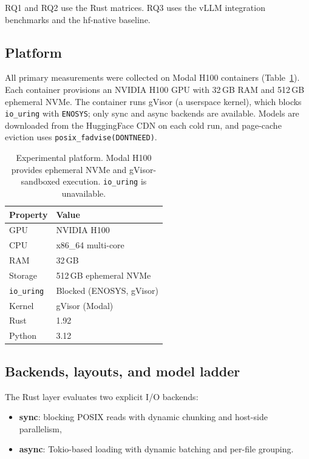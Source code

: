 RQ1 and RQ2 use the Rust matrices. RQ3 uses the vLLM integration benchmarks and the hf-native baseline.

\subsection{Platform}

All primary measurements were collected on Modal H100 containers (Table~\ref{tab:platform}). Each container provisions an NVIDIA H100 GPU with 32\,GB RAM and 512\,GB ephemeral NVMe. The container runs gVisor (a userspace kernel), which blocks \texttt{io\_uring} with \texttt{ENOSYS}; only sync and async backends are available. Models are downloaded from the HuggingFace CDN on each cold run, and page-cache eviction uses \texttt{posix\_fadvise(DONTNEED)}.

\begin{table}[htbp]
\caption{Experimental platform. Modal H100 provides ephemeral NVMe and gVisor-sandboxed execution. \texttt{io\_uring} is unavailable.}
\label{tab:platform}
\centering
\small
\begin{tabular}{ll}
\toprule
\textbf{Property} & \textbf{Value} \\
\midrule
GPU & NVIDIA H100 \\
CPU & x86\_64 multi-core \\
RAM & 32\,GB \\
Storage & 512\,GB ephemeral NVMe \\
\texttt{io\_uring} & Blocked (ENOSYS, gVisor) \\
Kernel & gVisor (Modal) \\
Rust & 1.92 \\
Python & 3.12 \\
\bottomrule
\end{tabular}
\end{table}

\subsection{Backends, layouts, and model ladder}

The Rust layer evaluates two explicit I/O backends:
\begin{itemize}
\item \textbf{sync}: blocking POSIX reads with dynamic chunking and host-side parallelism,
\item \textbf{async}: Tokio-based loading with dynamic batching and per-file grouping.
\end{itemize}


